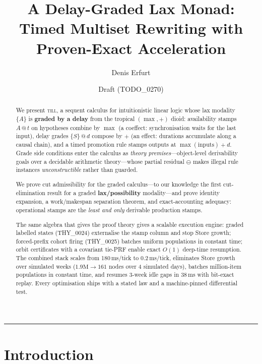 \documentclass[11pt]{article}
\title{A Delay-Graded Lax Monad:\\
  Timed Multiset Rewriting with Proven-Exact Acceleration}
\author{Denis Erfurt}
\date{Draft (TODO\_0270)}
\makeatletter
\newcommand{\lax}[2]{\{#1\}\mathbin{@}#2}       %
\newcommand{\res}{\mathbin{\ominus}}             %
\newcommand{\stmp}[2]{#1\mathbin{@}#2}           %
\newcommand{\till}{\textsc{till}}                %
\theoremstyle{definition}
\theoremstyle{remark}
\makeatother
\begin{document}
\maketitle

\begin{abstract}
We present \till{}, a sequent calculus for intuitionistic linear logic
whose lax modality $\{A\}$ is \textbf{graded by a delay} from the tropical
$(\max,{+})$ dioid: availability stamps $\stmp{A}{t}$ on hypotheses combine by
$\max$ (a coeffect: synchronisation waits for the last input), delay grades
$\lax{S}{d}$ compose by $+$ (an effect: durations accumulate along a causal
chain), and a timed promotion rule stamps outputs at $\max(\text{inputs})+d$.
Grade side conditions enter the calculus as \emph{theory premises}---object-level
derivability goals over a decidable arithmetic theory---whose partial residual
$\res$ makes illegal rule instances \emph{unconstructible} rather than guarded.

We prove cut admissibility for the graded calculus---to our knowledge the first
cut-elimination result for a graded \textbf{lax/possibility} modality---and
prove identity expansion, a work/makespan separation theorem, and exact-accounting
adequacy: operational stamps are the \emph{least and only} derivable production
stamps.

The same algebra that gives the proof theory gives a scalable execution engine:
graded labelled states (THY\_0024) externalise the stamp column and stop Store
growth; forced-prefix cohort firing (THY\_0025) batches uniform populations in
constant time; orbit certificates with a covariant tie-PRF enable exact
$O(1)$ deep-time resumption.  The combined stack scales from 180\,ms/tick to
0.2\,ms/tick, eliminates Store growth over simulated weeks ($1.9\text{M} \to 161$
nodes over 4 simulated days), batches million-item populations in constant time,
and resumes 3-week idle gaps in 38\,ms with bit-exact replay.  Every optimisation
ships with a stated law and a machine-pinned differential test.
\end{abstract}

\tableofcontents
\bigskip\hrule\bigskip

\section{Introduction}
\label{sec:intro}
\end{document}
